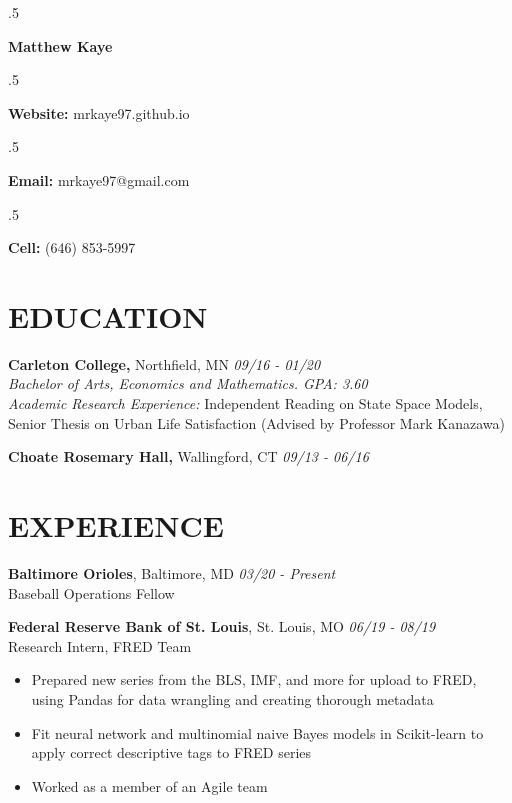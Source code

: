 \documentclass[margin, 10pt]{res} %
\begin{document}
\singlespacing

\moveleft.5\hoffset\centerline{\LARGE\bf Matthew Kaye} %
\medskip
\moveleft.5\hoffset\centerline{\textbf{Website:} mrkaye97.github.io}
\moveleft.5\hoffset\centerline{\textbf{Email:} mrkaye97@gmail.com}
\moveleft.5\hoffset\centerline{\textbf{Cell:} (646) 853-5997}


\begin{resume}


\section{EDUCATION}

{\sl} \textbf{Carleton College,} Northfield, MN \hfill \textit{09/16 - 01/20}\smallskip\\
{\sl Bachelor of Arts, Economics and Mathematics. GPA: 3.60} \smallskip\\
{\sl Academic Research Experience: } Independent Reading on State Space Models, Senior Thesis on Urban Life Satisfaction (Advised by Professor Mark Kanazawa)

{\sl} \textbf{Choate Rosemary Hall,} Wallingford, CT \hfill \textit{09/13 -  06/16}

\section{EXPERIENCE}

{\sl} \textbf{Baltimore Orioles}, Baltimore, MD \hfill \textit{03/20 - Present}\\
{\sl} Baseball Operations Fellow \smallskip

{\sl} \textbf{Federal Reserve Bank of St. Louis}, St. Louis, MO \hfill \textit{06/19 - 08/19}\\
{\sl} Research Intern, FRED Team \smallskip
{\sl} \begin{itemize}
	\item Prepared new series from the BLS, IMF, and more for upload to FRED, using Pandas for data wrangling and creating thorough metadata
	\item Fit neural network and multinomial naive Bayes models in Scikit-learn to apply correct descriptive tags to FRED series
	\item Worked as a member of an Agile team
\end{itemize}


\end{resume}
\end{document}
